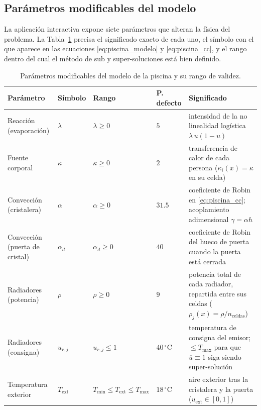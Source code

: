 \begin{itemize}
\subsection{Parámetros modificables del modelo}

La aplicación interactiva expone siete parámetros que alteran la física del
problema. La Tabla~\ref{tab:piscina_parametros} precisa el significado exacto de
cada uno, el símbolo con el que aparece en las ecuaciones
\eqref{eq:piscina_modelo} y \eqref{eq:piscina_cc}, y el rango dentro del cual el
método de sub y super-soluciones está bien definido.

\begin{table}[htbp]
  \centering
  \caption{Parámetros modificables del modelo de la piscina y su rango de
  validez.}\label{tab:piscina_parametros}
  \small
  \begin{tabular}{@{}llllp{3.6cm}@{}}
    \toprule
    \textbf{Parámetro} & \textbf{Símbolo} & \textbf{Rango} & \textbf{P. defecto} & \textbf{Significado} \\
    \midrule
    Reacción (evaporación) & $\lambda$ & $\lambda \geq 0$ & $5$ & intensidad de la no
    linealidad logística $\lambda\,u(1-u)$ \\
    Fuente corporal & $\kappa$ & $\kappa \geq 0$ & $2$ & transferencia de calor de cada
    persona ($\kappa_i(x) = \kappa$ en su celda) \\
    Convección (cristalera) & $\alpha$ & $\alpha \geq 0$ & $31.5$ & coeficiente de Robin en
    \eqref{eq:piscina_cc}; acoplamiento adimensional $\gamma = \alpha h$ \\
    Convección (puerta de cristal) & $\alpha_d$ & $\alpha_d \geq 0$ & $40$ & coeficiente de
    Robin del hueco de puerta cuando la puerta está cerrada \\
    Radiadores (potencia) & $\rho$ & $\rho \geq 0$ & $9$ & potencia total de cada
    radiador, repartida entre sus celdas ($\rho_j(x) = \rho/n_{\mathrm{celdas}}$) \\
    Radiadores (consigna) & $u_{r,j}$ & $u_{r,j} \leq 1$ & $40\,^{\circ}\mathrm{C}$ &
    temperatura de consigna del emisor; $\le T_{\max}$ para que
    $\overline{u} \equiv 1$ siga siendo super-solución \\
    Temperatura exterior & $T_{\mathrm{ext}}$ & $T_{\min} \leq T_{\mathrm{ext}}
    \leq T_{\max}$ & $18\,^{\circ}\mathrm{C}$ & aire exterior tras la cristalera y la
    puerta ($u_{\mathrm{ext}} \in [0,1]$) \\
    \bottomrule
  \end{tabular}
\end{table}


\end{itemize}
